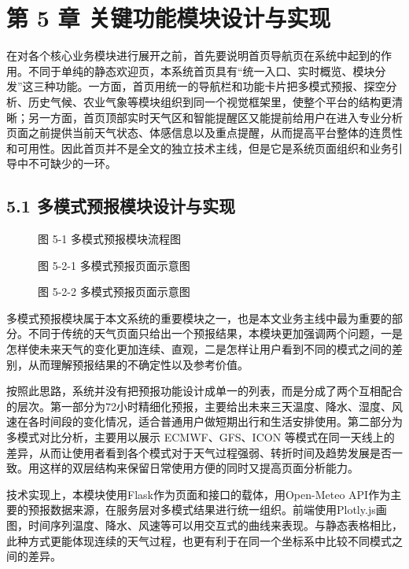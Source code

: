 \section{第 5 章 关键功能模块设计与实现}

在对各个核心业务模块进行展开之前，首先要说明首页导航页在系统中起到的作用。不同于单纯的静态欢迎页，本系统首页具有“统一入口、实时概览、模块分发”这三种功能。一方面，首页用统一的导航栏和功能卡片把多模式预报、探空分析、历史气候、农业气象等模块组织到同一个视觉框架里，使整个平台的结构更清晰；另一方面，首页顶部实时天气区和智能提醒区又能提前给用户在进入专业分析页面之前提供当前天气状态、体感信息以及重点提醒，从而提高平台整体的连贯性和可用性。因此首页并不是全文的独立技术主线，但是它是系统页面组织和业务引导中不可缺少的一环。

\subsection{5.1 多模式预报模块设计与实现}

\begin{figure}[htbp]
\centering
\caption{图 5-1  多模式预报模块流程图}
\label{fig:5-1}
\end{figure}

\begin{figure}[htbp]
\centering
\caption{图 5-2-1  多模式预报页面示意图}
\label{fig:5-2}
\end{figure}

\begin{figure}[htbp]
\centering
\caption{图 5-2-2  多模式预报页面示意图}
\label{fig:5-2}
\end{figure}

多模式预报模块属于本文系统的重要模块之一，也是本文业务主线中最为重要的部分。不同于传统的天气页面只给出一个预报结果，本模块更加强调两个问题，一是怎样使未来天气的变化更加连续、直观，二是怎样让用户看到不同的模式之间的差别，从而理解预报结果的不确定性以及参考价值。

按照此思路，系统并没有把预报功能设计成单一的列表，而是分成了两个互相配合的层次。第一部分为72小时精细化预报，主要给出未来三天温度、降水、湿度、风速在各时间段的变化情况，适合普通用户做短期出行和生活安排使用。第二部分为多模式对比分析，主要用以展示 ECMWF、GFS、ICON 等模式在同一天线上的差异，从而让使用者看到各个模式对于天气过程强弱、转折时间及趋势发展是否一致。用这样的双层结构来保留日常使用方便的同时又提高页面分析能力。

技术实现上，本模块使用Flask作为页面和接口的载体，用Open-Meteo API作为主要的预报数据来源，在服务层对多模式结果进行统一组织。前端使用Plotly.js画图，时间序列温度、降水、风速等可以用交互式的曲线来表现。与静态表格相比，此种方式更能体现连续的天气过程，也更有利于在同一个坐标系中比较不同模式之间的差异。

